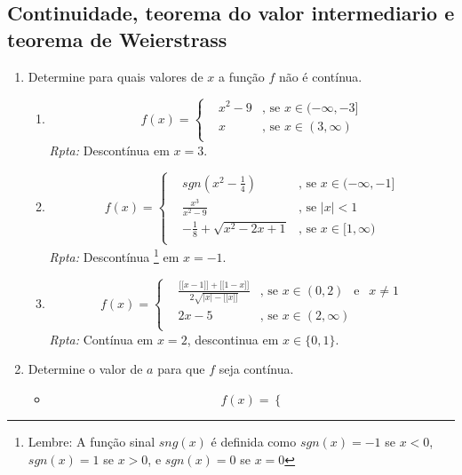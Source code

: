 \documentclass[latin,20pt]{article}
\begin{document}
    \subsection{Continuidade, teorema do valor intermediario e teorema de Weierstrass}   
    \begin{enumerate}
    \item Determine para quais valores de $x$ a função $f$ não é contínua.
       \begin{enumerate}
       \item  $$
    f(x)= \left\{  
            \begin{array}{lll}
    &x^2-9 &\text{, se } x \in (-\infty, -3] \\
    &x     &\text{, se } x \in (3,\infty) \\
            \end{array}
            \right. 
    $$
    {\it Rpta:} Descontínua em $x=3$.
       \item 
        $$
    f(x)= \left\{  
            \begin{array}{lll}
    & sgn\left( x^{2}-\frac{1}{4}\right) &\text{, se } x \in (-\infty, -1] \\
    &\frac{x^3}{x^2-9}     &\text{, se } |x| < 1 \\
    &-\frac{1}{8}+\sqrt{x^2-2x+1}     &\text{, se } x \in [1,\infty) \\
            \end{array}
            \right. 
    $$
    {\it Rpta: } Descontínua \footnote{Lembre: A função sinal $sng(x)$
    é definida como $sgn(x)=-1$ se $x<0$, $sgn(x)=1$ se $x>0$, e
    $sgn(x)=0$ se $x=0$} em $x=-1$. 
    \item 
     $$
    f(x)= \left\{  
            \begin{array}{lll}
    &\frac{\lbrack\!\lbrack x-1\rbrack\!\rbrack+\lbrack\!\lbrack 1-x\rbrack\!\rbrack}{2\sqrt{|x|-\lbrack\!\lbrack x\rbrack\!\rbrack}} &\text{, se } x \in (0,2) \ \ \text{ e } \ \  x \neq 1 \\
    & 2x-5    &\text{, se } x \in (2,\infty) \\
            \end{array}
            \right. 
    $$
    {\it Rpta:} Contínua em $x=2$, descontinua em $x \in \{0,1\}$.
       \end{enumerate}
    \item Determine o valor de $a$ para que $f$ seja contínua.
      \begin{itemize}
      \item $$
    f(x)= \left\{  
$$
\end{itemize}
\end{enumerate}
\end{document}
